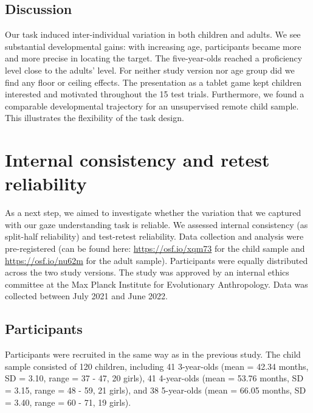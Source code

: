 \documentclass[
  man,floatsintext]{apa6}
\begin{document}
\hypertarget{discussion}{%
\subsection{Discussion}\label{discussion}}

Our task induced inter-individual variation in both children and adults.
We see substantial developmental gains: with increasing age, participants became more and more precise in locating the target.
The five-year-olds reached a proficiency level close to the adults' level.
For neither study version nor age group did we find any floor or ceiling effects.
The presentation as a tablet game kept children interested and motivated throughout the 15 test trials.
Furthermore, we found a comparable developmental trajectory for an unsupervised remote child sample.
This illustrates the flexibility of the task design.

\hypertarget{internal-consistency-and-retest-reliability}{%
\section{Internal consistency and retest reliability}\label{internal-consistency-and-retest-reliability}}

As a next step, we aimed to investigate whether the variation that we captured with our gaze understanding task is reliable.
We assessed internal consistency (as split-half reliability) and test-retest reliability.
Data collection and analysis were pre-registered (can be found here: \url{https://osf.io/xqm73} for the child sample and \url{https://osf.io/nu62m} for the adult sample).
Participants were equally distributed across the two study versions.
The study was approved by an internal ethics committee at the Max Planck Institute for Evolutionary Anthropology.
Data was collected between July 2021 and June 2022.

\hypertarget{participants-1}{%
\subsection{Participants}\label{participants-1}}

Participants were recruited in the same way as in the previous study.
The child sample consisted of 120 children, including 41 3-year-olds (mean = 42.34 months, SD = 3.10, range = 37 - 47, 20 girls), 41 4-year-olds (mean = 53.76 months, SD = 3.15, range = 48 - 59, 21 girls), and 38 5-year-olds (mean = 66.05 months, SD = 3.40, range = 60 - 71, 19 girls).
\end{document}
